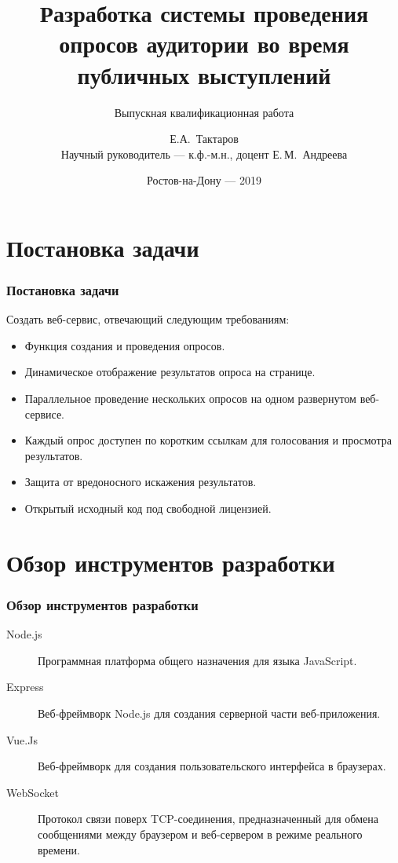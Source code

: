 \documentclass{beamer}
\title[Выпускная квалификационная работа]{Разработка системы проведения опросов аудитории во время публичных выступлений} %
\subtitle{Выпускная квалификационная работа}
\author{Е.А.~Тактаров\\Научный руководитель ---  к.ф.-м.н., доцент Е.\,М.~Андреева} %
\institute[ИММиКН] %
{
Южный Федеральный Университет\\
Институт математики, механики и компьютерных наук им. И.И. Воровича  \\ %
02.03.02 — Фундаментальная информатика и информационные технологии
}
\date{Ростов-на-Дону --- 2019} %
\begin{document}
\begin{frame}
\titlepage %
\end{frame}



\section{Постановка задачи}
\begin{frame}
\frametitle{Постановка задачи}
Создать веб-сервис, отвечающий следующим требованиям:
\begin{itemize}
	\item Функция создания и проведения опросов. 
	\item Динамическое отображение результатов опроса на странице.
	\item Параллельное проведение нескольких опросов на одном развернутом веб-сервисе.
	\item Каждый опрос доступен по коротким ссылкам для голосования и просмотра результатов.
	\item Защита от вредоносного искажения результатов. 
	\item Открытый исходный код под свободной лицензией.
\end{itemize}
\end{frame}

\section{Обзор инструментов разработки}
\begin{frame}
\frametitle{Обзор инструментов разработки}
\begin{description}
	\item[Node.js] Программная платформа общего назначения для языка JavaScript. 
	\item[Express] Веб-фреймворк Node.js для создания серверной части веб-приложения.
	\item[Vue.Js] Веб-фреймворк для создания пользовательского интерфейса в браузерах.  
	\item[WebSocket] Протокол связи поверх TCP-соединения, предназначенный для обмена сообщениями между браузером и веб-сервером в режиме реального времени.

\end{description}
\end{frame}
\end{document}
